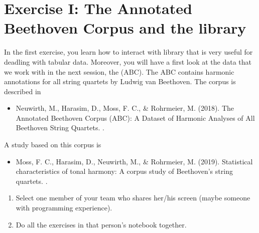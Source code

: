 \documentclass[letterpaper,10pt,english]{sphinxmanual}
\begin{document}
\chapter{Exercise I: The Annotated Beethoven Corpus and the  library}
\label{\detokenize{exercises/01_exercise:Exercise-I:-The-Annotated-Beethoven-Corpus-and-the-pandas-library}}\label{\detokenize{exercises/01_exercise::doc}}
\sphinxAtStartPar
In the first exercise, you learn how to interact with  library that is very useful for deadling with tabular data. Moreover, you will have a first look at the data that we work with in the next session, the  (ABC). The ABC contains harmonic annotations for all string quartets by Ludwig van Beethoven. The corpus is described in
\begin{itemize}
\item {} 
\sphinxAtStartPar
Neuwirth, M., Harasim, D., Moss, F. C., \& Rohrmeier, M. (2018). The Annotated Beethoven Corpus (ABC): A Dataset of Harmonic Analyses of All Beethoven String Quartets. . 

\end{itemize}

\sphinxAtStartPar
A study based on this corpus is
\begin{itemize}
\item {} 
\sphinxAtStartPar
Moss, F. C., Harasim, D., Neuwirth, M., \& Rohrmeier, M. (2019). Statistical characteristics of tonal harmony: A corpus study of Beethoven’s string quartets. . 

\end{itemize}

\sphinxAtStartPar
{}
\begin{enumerate}
%
\item {} 
\sphinxAtStartPar
Select one member of your team who shares her/his screen (maybe someone with  programming experience).

\item {} 
\sphinxAtStartPar
Do all the exercises in that person’s notebook together.

\end{enumerate}
\end{document}
